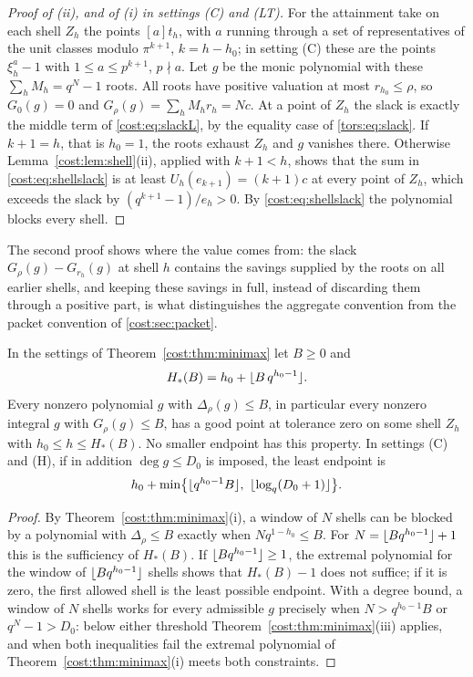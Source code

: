 \begin{proof}[Proof of \textup{(ii)}, and of \textup{(i)} in settings \textup{(C)} and \textup{(LT)}]
For the attainment take on each shell $Z_h$ the points $[a]t_h$, with $a$ running through
a set of representatives of the unit classes modulo $\pi^{k+1}$, $k=h-h_0$; in setting
\textup{(C)} these are the points $\xi_h^a-1$ with $1\le a\le p^{k+1}$, $p\nmid a$. Let $g$
be the monic polynomial with these $\sum_hM_h=q^N-1$ roots. All roots have positive
valuation at most $r_{h_0}\le\rho$, so $G_0(g)=0$ and $G_\rho(g)=\sum_hM_hr_h=Nc$. At a
point of $Z_h$ the slack is exactly the middle term of \eqref{cost:eq:slackL}, by the
equality case of \eqref{tors:eq:slack}. If $k+1=h$, that is $h_0=1$, the roots exhaust
$Z_h$ and $g$ vanishes there. Otherwise Lemma~\ref{cost:lem:shell}(ii), applied with
$k+1<h$, shows that the sum in \eqref{cost:eq:shellslack} is at least
$U_h(e_{k+1})=(k+1)c$ at every point of $Z_h$, which exceeds the slack by
$(q^{k+1}-1)/e_h>0$. By \eqref{cost:eq:shellslack} the polynomial blocks every shell.
\end{proof}

The second proof shows where the value comes from: the slack
$G_\rho(g)-G_{r_h}(g)$ at shell $h$ contains the savings supplied by the roots on all
earlier shells, and keeping these savings in full, instead of discarding them through a
positive part, is what distinguishes the aggregate convention from the packet convention of
\cref{cost:sec:packet}.

\begin{corollary}\label{cost:cor:endpoint}
In the settings of Theorem~\ref{cost:thm:minimax} let $B\ge0$ and
\[
 H_*(B)=h_0+\lfloor B\,q^{h_0-1}\rfloor.
\]
Every nonzero polynomial $g$ with $\Delta_\rho(g)\le B$, in particular every nonzero
integral $g$ with $G_\rho(g)\le B$, has a good point at tolerance zero on some shell $Z_h$
with $h_0\le h\le H_*(B)$. No smaller endpoint has this property. In settings \textup{(C)} and \textup{(H)}, if in addition $\deg g\le D_0$ is
imposed, the least endpoint is
\[
 h_0+\min\bigl\{\floor{q^{h_0-1}B},\ \floor{\log_q(D_0+1)}\bigr\}.
\]
\end{corollary}

\begin{proof}
By Theorem~\ref{cost:thm:minimax}(i), a window of $N$ shells can be blocked by a polynomial
with $\Delta_\rho\le B$ exactly when $Nq^{1-h_0}\le B$. For $N=\lfloor Bq^{h_0-1}\rfloor+1$ this
is the sufficiency of $H_*(B)$. If $\lfloor Bq^{h_0-1}\rfloor\ge1$, the extremal polynomial for the window of
$\lfloor Bq^{h_0-1}\rfloor$ shells shows that $H_*(B)-1$ does not suffice; if it is zero, the
first allowed shell is the least possible endpoint. With a degree bound, a window of $N$
shells works for every admissible $g$ precisely when $N>q^{h_0-1}B$ or $q^N-1>D_0$: below
either threshold Theorem~\ref{cost:thm:minimax}(iii) applies, and when both inequalities
fail the extremal polynomial of Theorem~\ref{cost:thm:minimax}(i) meets both constraints.
\end{proof}

